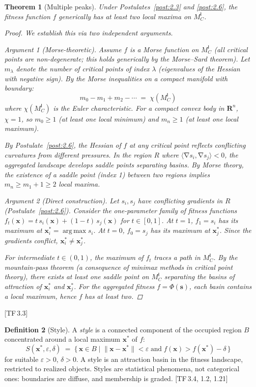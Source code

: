 \documentclass[11pt, a4paper]{article}
\theoremstyle{definition}
\newtheorem{definition}{Definition}[section]
\theoremstyle{plain}
\newtheorem{theorem}[definition]{Theorem}
\theoremstyle{remark}
\newcommand{\MC}{M^{\mathsf{I}}_C}          %
\providecommand{\Rn}{}
\renewcommand{\Rn}{\mathbf{R}^n}            %
\newcommand{\inner}[2]{\langle #1, #2 \rangle}
\newcommand{\norm}[1]{\lVert #1 \rVert}
\DeclareMathOperator{\grad}{\nabla}
\DeclareMathOperator{\argmax}{arg\,max}
\newcommand{\TF}[1]{\textnormal{[TF\,#1]}}  %
\begin{document}
\begin{theorem}[Multiple peaks]\label{thm:3.3}
Under Postulates~\ref{post:2.3} and \ref{post:2.6}, the fitness function
$f$ generically has at least two local maxima on $\MC$.

\begin{proof}
We establish this via two independent arguments.

\medskip\noindent\textit{Argument 1 (Morse-theoretic).}\;
Assume $f$ is a Morse function on $\MC$ (all critical points are
non-degenerate; this holds generically by the Morse--Sard theorem).
Let $m_\lambda$ denote the number of critical points of index $\lambda$
(eigenvalues of the Hessian with negative sign). By the Morse
inequalities on a compact manifold with boundary:
\[
  m_0 - m_1 + m_2 - \cdots \;=\; \chi(\MC)
\]
where $\chi(\MC)$ is the Euler characteristic. For a compact convex
body in $\Rn$, $\chi = 1$, so $m_0 \geq 1$ (at least one local
minimum) and $m_n \geq 1$ (at least one local maximum).

By Postulate~\ref{post:2.6}, the Hessian of $f$ at any critical point
reflects conflicting curvatures from different pressures. In the region
$R$ where $\inner{\grad s_i}{\grad s_j} < 0$, the aggregated landscape
develops saddle points separating basins. By Morse theory, the existence
of a saddle point (index 1) between two regions implies
$m_n \geq m_1 + 1 \geq 2$ local maxima.

\medskip\noindent\textit{Argument 2 (Direct construction).}\;
Let $s_i, s_j$ have conflicting gradients in $R$ (Postulate~\ref{post:2.6}).
Consider the one-parameter family of fitness functions
$f_t(\bm{x}) = t \, s_i(\bm{x}) + (1-t) \, s_j(\bm{x})$ for
$t \in [0,1]$. At $t = 1$, $f_1 = s_i$ has its maximum at
$\bm{x}_i^* = \argmax s_i$. At $t = 0$, $f_0 = s_j$ has its maximum
at $\bm{x}_j^*$. Since the gradients conflict, $\bm{x}_i^* \neq \bm{x}_j^*$.

For intermediate $t \in (0,1)$, the maximum of $f_t$ traces a path in
$\MC$. By the mountain-pass theorem (a consequence of minimax methods
in critical point theory), there exists at least one saddle point on
$\MC$ separating the basins of attraction of $\bm{x}_i^*$ and
$\bm{x}_j^*$. For the aggregated fitness $f = \Phi(\bm{s})$, each
basin contains a local maximum, hence $f$ has at least two. \qedhere
\end{proof}
\end{theorem}

\TF{3.3}

\begin{definition}[Style]\label{def:3.4}
A \emph{style} is a connected component of the occupied region $B$
concentrated around a local maximum $\bm{x}^*$ of $f$:
\[
  S(\bm{x}^*, \varepsilon, \delta) \;=\;
  \bigl\{\, \bm{x} \in B \;\big|\;
    \norm{\bm{x} - \bm{x}^*} < \varepsilon
    \;\text{and}\;
    f(\bm{x}) > f(\bm{x}^*) - \delta
  \,\bigr\}
\]
for suitable $\varepsilon > 0$, $\delta > 0$. A style is an attraction
basin in the fitness landscape, restricted to realized objects.
Styles are statistical phenomena, not categorical ones: boundaries are
diffuse, and membership is graded. \TF{3.4, 1.2, 1.21}
\end{definition}
\end{document}
